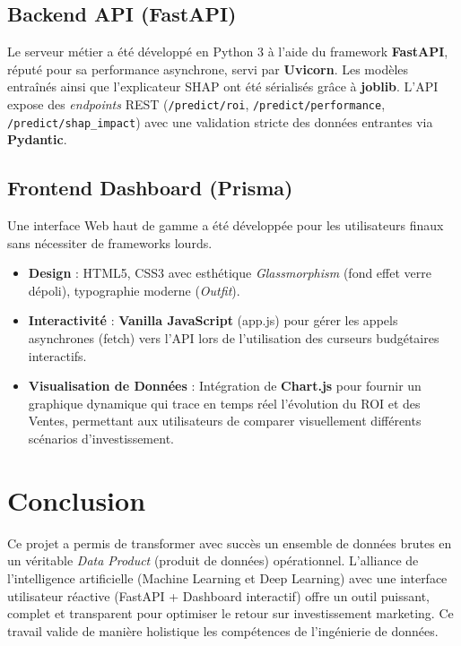 \documentclass[a4paper,12pt]{article}
\begin{document}
\subsection{Backend API (FastAPI)}
Le serveur métier a été développé en Python 3 à l'aide du framework \textbf{FastAPI}, réputé pour sa performance asynchrone, servi par \textbf{Uvicorn}. 
Les modèles entraînés ainsi que l'explicateur SHAP ont été sérialisés grâce à \textbf{joblib}. L'API expose des \textit{endpoints} REST (\texttt{/predict/roi}, \texttt{/predict/performance}, \texttt{/predict/shap\_impact}) avec une validation stricte des données entrantes via \textbf{Pydantic}.

\subsection{Frontend Dashboard (Prisma)}
Une interface Web haut de gamme a été développée pour les utilisateurs finaux sans nécessiter de frameworks lourds.
\begin{itemize}
    \item \textbf{Design} : HTML5, CSS3 avec esthétique \textit{Glassmorphism} (fond effet verre dépoli), typographie moderne (\textit{Outfit}).
    \item \textbf{Interactivité} : \textbf{Vanilla JavaScript} (app.js) pour gérer les appels asynchrones (fetch) vers l'API lors de l'utilisation des curseurs budgétaires interactifs.
    \item \textbf{Visualisation de Données} : Intégration de \textbf{Chart.js} pour fournir un graphique dynamique qui trace en temps réel l'évolution du ROI et des Ventes, permettant aux utilisateurs de comparer visuellement différents scénarios d'investissement.
\end{itemize}

\section{Conclusion}
Ce projet a permis de transformer avec succès un ensemble de données brutes en un véritable \textit{Data Product} (produit de données) opérationnel. 
L'alliance de l'intelligence artificielle (Machine Learning et Deep Learning) avec une interface utilisateur réactive (FastAPI + Dashboard interactif) offre un outil puissant, complet et transparent pour optimiser le retour sur investissement marketing. Ce travail valide de manière holistique les compétences de l'ingénierie de données.
\end{document}
